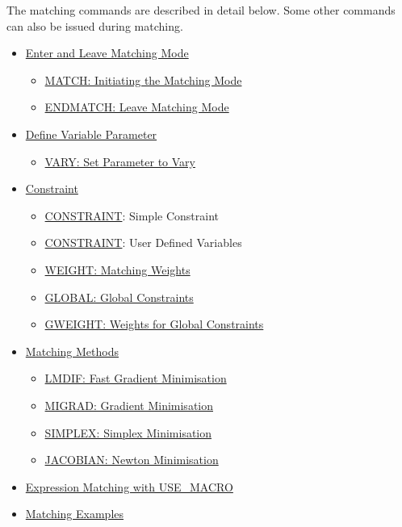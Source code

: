 The matching commands are described in detail below. Some other commands can also be issued during matching.  
\begin{itemize}
	\item \href{match_main.html}{Enter and Leave Matching Mode}
\begin{itemize}
	\item \href{match_main.html#match}{MATCH: Initiating the Matching Mode}
	\item \href{match_main.html#endmatch}{ENDMATCH: Leave Matching Mode}
\end{itemize}
	\item \href{match_vary.html}{Define Variable Parameter}
\begin{itemize}
	\item \href{match_vary.html#vary}{VARY: Set Parameter to Vary}
\end{itemize}
	\item \href{match_con.html}{Constraint}
\begin{itemize}
	\item \href{match_con.html#constraint}{CONSTRAINT}: Simple Constraint 
	\item \href{match_con.html#user-var}{CONSTRAINT}: User Defined Variables 
	\item \href{match_con.html#weight}{WEIGHT: Matching Weights}
	\item \href{match_con.html#global}{GLOBAL: Global Constraints}
	\item \href{match_con.html#global}{GWEIGHT: Weights for Global Constraints}
\end{itemize}
	\item \href{match_xeq.html}{Matching Methods}
\begin{itemize}
	\item \href{match_xeq.html#lmdif}{LMDIF: Fast Gradient Minimisation}
	\item \href{match_xeq.html#migrad}{MIGRAD: Gradient Minimisation}
	\item \href{match_xeq.html#simplex}{SIMPLEX: Simplex Minimisation}
	\item \href{match_xeq.html#jacobian}{JACOBIAN: Newton Minimisation}
\end{itemize}
	\item \href{match_um.html}{Expression Matching with USE\_MACRO}
\item \href{match_xmpl.html}{Matching Examples}
\end{itemize}









